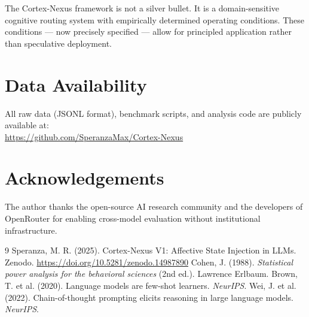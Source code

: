 \documentclass[12pt, a4paper]{article}
\begin{document}
The Cortex-Nexus framework is not a silver bullet. It is a domain-sensitive cognitive routing system with empirically determined operating conditions. These conditions — now precisely specified — allow for principled application rather than speculative deployment.

\section*{Data Availability}
All raw data (JSONL format), benchmark scripts, and analysis code are publicly available at:\\
\url{https://github.com/SperanzaMax/Cortex-Nexus}

\section*{Acknowledgements}
The author thanks the open-source AI research community and the developers of OpenRouter for enabling cross-model evaluation without institutional infrastructure.


\begin{thebibliography}{9}
 Speranza, M. R. (2025). Cortex-Nexus V1: Affective State Injection in LLMs. Zenodo. \url{https://doi.org/10.5281/zenodo.14987890}
 Cohen, J. (1988). \textit{Statistical power analysis for the behavioral sciences} (2nd ed.). Lawrence Erlbaum.
 Brown, T. et al. (2020). Language models are few-shot learners. \textit{NeurIPS}.
 Wei, J. et al. (2022). Chain-of-thought prompting elicits reasoning in large language models. \textit{NeurIPS}.
\end{thebibliography}
\end{document}
